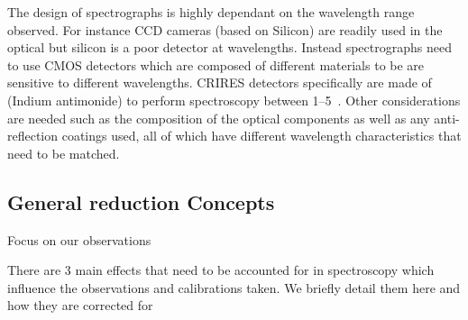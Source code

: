 The design of spectrographs is highly dependant on the wavelength range observed. For instance {CCD} cameras (based on Silicon) are readily used in the optical but silicon is a poor detector at \nir{} wavelengths. Instead \nir{} spectrographs need to use CMOS detectors which are composed of different materials to be are sensitive to different wavelengths. {CRIRES} detectors specifically are made of  (Indium antimonide) to perform spectroscopy between 1--5\um{}~\cite{dorn_crires_2004}.
Other considerations are needed such as the composition of the optical components as well as any anti-reflection coatings used, all of which have different wavelength characteristics that need to be matched.


\subsection{General reduction Concepts}
\label{subsec:nirreduction}

Focus on our observations\todo{}

There are 3 main effects that need to be accounted for in \nir{} spectroscopy which influence the observations and calibrations taken. We briefly detail them here and how they are corrected for


